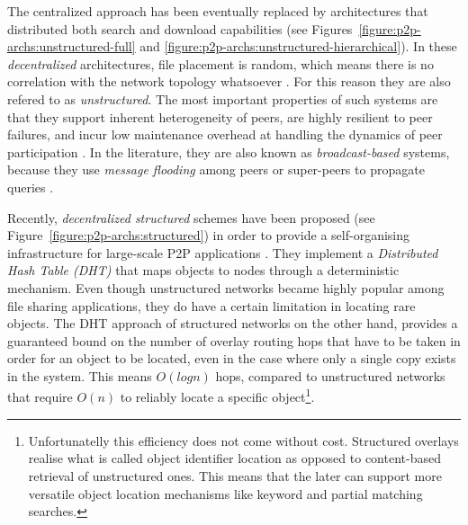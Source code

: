 \documentclass[acmcsur,acmnow]{acmtrans2m}
\begin{document}
The centralized approach has been eventually replaced by architectures that distributed both search and download capabilities (see Figures~\ref{figure:p2p-archs:unstructured-full} and \ref{figure:p2p-archs:unstructured-hierarchical}). In these \emph{decentralized} architectures, file placement is random, which means there is no correlation with the network topology whatsoever \cite{yang_improvep2psearch_2002}. For this reason they are also refered to as \emph{unstructured}. The most important properties of such systems are that they support inherent heterogeneity of peers, are highly resilient to peer failures, and incur low maintenance overhead at handling the dynamics of peer participation \cite{stutzbach_churn_2006}. In the literature, they are also known as \emph{broadcast-based} systems, because they use \emph{message flooding} among peers or super-peers to propagate queries
.

Recently, \emph{decentralized structured} schemes have been proposed (see Figure~\ref{figure:p2p-archs:structured}) in order to provide a self-organising infrastructure for large-scale P2P applications \cite{ratnasamy_can_2001, stoica_chord_2001, antony_pastry_2001, zhao_tapestry_2001, maymounkov_kademlia_2002, rgrk_bamboo_2004}. They implement a \emph{Distributed Hash Table (DHT)} that maps objects to nodes through a deterministic mechanism. Even though unstructured networks became highly popular among file sharing applications, they do have a certain limitation in locating rare objects. The DHT approach of structured networks on the other hand, provides a guaranteed bound on the number of overlay routing hops that have to be taken in order for an object to be located, even in the case where only a single copy exists in the system.  This means $O \left ( log n \right )$ hops, compared to unstructured networks that require $O \left ( n \right )$ to reliably locate a specific object\footnote{Unfortunatelly this efficiency does not come without cost. Structured overlays realise what is called object identifier location as opposed to content-based retrieval of unstructured ones. This means that the later can support more versatile object location mechanisms like keyword and partial matching searches.}.
\end{document}
